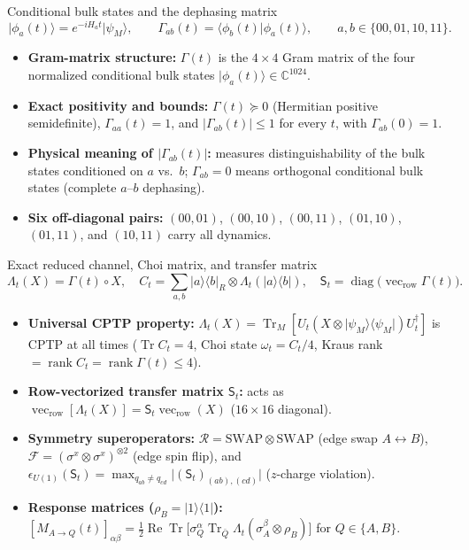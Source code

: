 \documentclass[aspectratio=169,11pt]{beamer}
\newcommand{\ket}[1]{\lvert #1\rangle}
\newcommand{\bra}[1]{\langle #1\rvert}
\newcommand{\Tr}{\operatorname{Tr}}
\newcommand{\diag}{\operatorname{diag}}
\newcommand{\rank}{\operatorname{rank}}
\newcommand{\St}{\mathsf S_t}
\begin{document}
\begin{frame}{Conditional bulk states and the dephasing matrix}
\small
\[
\ket{\phi_a(t)} = e^{-iH_a t}\ket{\psi_M},\qquad
\Gamma_{ab}(t) = \langle\phi_b(t)\vert\phi_a(t)\rangle,\qquad a,b\in\{00,01,10,11\}.
\]
\begin{itemize}\setlength\itemsep{5pt}
\item \textbf{Gram-matrix structure:} $\Gamma(t)$ is the $4\times 4$ Gram matrix of the four normalized conditional bulk states $\ket{\phi_a(t)}\in\mathbb C^{1024}$.
\item \textbf{Exact positivity and bounds:} $\Gamma(t)\succeq 0$ (Hermitian positive semidefinite), $\Gamma_{aa}(t)=1$, and $\lvert\Gamma_{ab}(t)\rvert\le 1$ for every $t$, with $\Gamma_{ab}(0)=1$.
\item \textbf{Physical meaning of $\lvert\Gamma_{ab}(t)\rvert$:} measures distinguishability of the bulk states conditioned on $a$ vs.\ $b$; $\Gamma_{ab}=0$ means orthogonal conditional bulk states (complete $a$--$b$ dephasing).
\item \textbf{Six off-diagonal pairs:} $(00,01)$, $(00,10)$, $(00,11)$, $(01,10)$, $(01,11)$, and $(10,11)$ carry all dynamics.
\end{itemize}
\end{frame}

\begin{frame}{Exact reduced channel, Choi matrix, and transfer matrix}
\small
\[
\Lambda_t(X)=\Gamma(t)\circ X,\quad
C_t=\sum_{a,b}\ket a\bra b_R\otimes\Lambda_t(\ket a\bra b),\quad
\St=\diag\bigl(\operatorname{vec}_{\mathrm{row}}\Gamma(t)\bigr).
\]
\begin{itemize}\setlength\itemsep{4pt}
\item \textbf{Universal CPTP property:} $\Lambda_t(X)=\Tr_M[U_t(X\otimes\ket{\psi_M}\bra{\psi_M})U_t^\dagger]$ is CPTP at all times ($\Tr C_t=4$, Choi state $\omega_t=C_t/4$, Kraus rank $=\rank C_t=\rank\Gamma(t)\le 4$).
\item \textbf{Row-vectorized transfer matrix $\St$:} acts as $\operatorname{vec}_{\mathrm{row}}[\Lambda_t(X)]=\St\operatorname{vec}_{\mathrm{row}}(X)$ ($16\times 16$ diagonal).
\item \textbf{Symmetry superoperators:} $\mathcal R=\mathrm{SWAP}\otimes\mathrm{SWAP}$ (edge swap $A\leftrightarrow B$), $\mathcal F=(\sigma^x\otimes\sigma^x)^{\otimes 2}$ (edge spin flip), and $\epsilon_{U(1)}(\St)=\max_{q_{ab}\neq q_{cd}}\lvert(\St)_{(ab),(cd)}\rvert$ ($z$-charge violation).
\item \textbf{Response matrices ($\rho_B=\ket1\bra1$):} $[M_{A\to Q}(t)]_{\alpha\beta}=\tfrac12\operatorname{Re}\Tr\bigl[\sigma_Q^\alpha\Tr_{\bar Q}\Lambda_t(\sigma_A^\beta\otimes\rho_B)\bigr]$ for $Q\in\{A,B\}$.
\end{itemize}
\end{frame}
\end{document}
